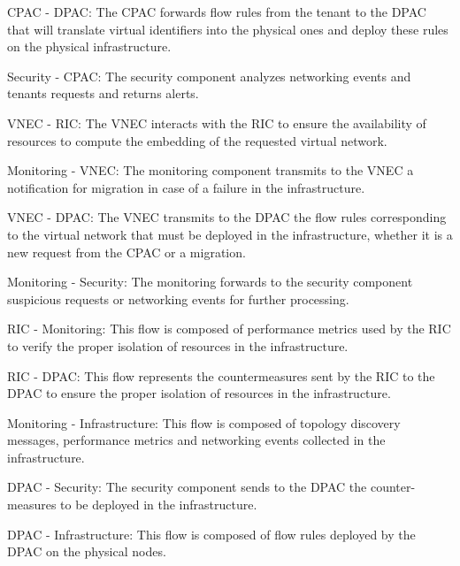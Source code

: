  CPAC - DPAC: The CPAC forwards flow rules from the tenant to the DPAC that will translate virtual identifiers into the physical ones and deploy these rules on the physical infrastructure.

 Security - CPAC: The security component analyzes networking events and tenants requests and returns alerts.

 VNEC - RIC: The VNEC interacts with the RIC to ensure the availability of resources to compute the embedding of the requested virtual network.

 Monitoring - VNEC: The monitoring component transmits to the VNEC a notification for migration in case of a failure in the infrastructure.

 VNEC - DPAC: The VNEC transmits to the DPAC the flow rules corresponding to the virtual network that must be deployed in the infrastructure, whether it is a new request from the CPAC or a migration.

 Monitoring - Security: The monitoring forwards to the security component suspicious requests or networking events for further processing.

 RIC - Monitoring: This flow is composed of performance metrics used by the RIC to verify the proper isolation of resources in the infrastructure.

 RIC - DPAC: This flow represents the countermeasures sent by the RIC to the DPAC to ensure the proper isolation of resources in the infrastructure.

 Monitoring - Infrastructure: This flow is composed of topology discovery messages, performance metrics and networking events collected in the infrastructure.

 DPAC - Security: The security component sends to the DPAC the counter-measures to be deployed in the infrastructure.

 DPAC - Infrastructure: This flow is composed of flow rules deployed by the DPAC on the physical nodes.

